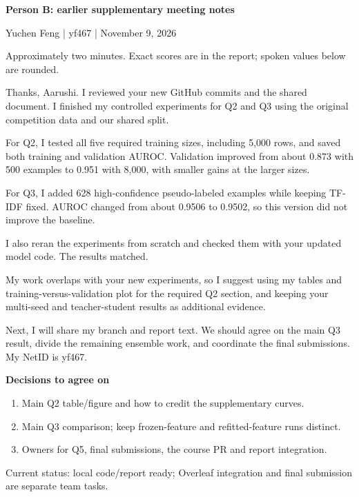 \documentclass[12pt,letterpaper]{article}
\begin{document}
{\Large\bfseries\color{navy} Person B: earlier supplementary meeting notes}\par
Yuchen Feng | yf467 | November 9, 2026\par
{\small\color{muted}Approximately two minutes. Exact scores are in the report; spoken values below are rounded.}\par
\vspace{0.5em}
Thanks, Aarushi. I reviewed your new GitHub commits and the shared document. I finished my controlled experiments for Q2 and Q3 using the original competition data and our shared split.

For Q2, I tested all five required training sizes, including 5,000 rows, and saved both training and validation AUROC. Validation improved from about 0.873 with 500 examples to 0.951 with 8,000, with smaller gains at the larger sizes.

For Q3, I added 628 high-confidence pseudo-labeled examples while keeping TF-IDF fixed. AUROC changed from about 0.9506 to 0.9502, so this version did not improve the baseline.

I also reran the experiments from scratch and checked them with your updated model code. The results matched.

My work overlaps with your new experiments, so I suggest using my tables and training-versus-validation plot for the required Q2 section, and keeping your multi-seed and teacher-student results as additional evidence.

Next, I will share my branch and report text. We should agree on the main Q3 result, divide the remaining ensemble work, and coordinate the final submissions. My NetID is yf467.

\vspace{0.5em}
\textbf{Decisions to agree on}
\begin{enumerate}
\item Main Q2 table/figure and how to credit the supplementary curves.
\item Main Q3 comparison; keep frozen-feature and refitted-feature runs distinct.
\item Owners for Q5, final submissions, the course PR and report integration.
\end{enumerate}
{\small\color{muted}Current status: local code/report ready; Overleaf integration and final submission are separate team tasks.}
\end{document}
